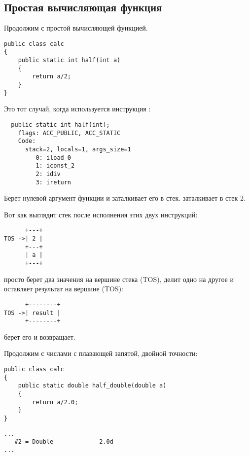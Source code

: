 \subsection{Простая вычисляющая функция}

Продолжим с простой вычисляющей функцией.

\begin{lstlisting}[style=customjava]
public class calc
{
	public static int half(int a)
	{
		return a/2;
	}
}
\end{lstlisting}


Это тот случай, когда используется инструкция :

\begin{lstlisting}
  public static int half(int);
    flags: ACC_PUBLIC, ACC_STATIC
    Code:
      stack=2, locals=1, args_size=1
         0: iload_0       
         1: iconst_2      
         2: idiv          
         3: ireturn       
\end{lstlisting}
         
Берет нулевой аргумент функции и заталкивает его в стек.
 заталкивает в стек 2.

Вот как выглядит стек после исполнения этих двух инструкций:

\begin{lstlisting}
      +---+
TOS ->| 2 |
      +---+
      | a |
      +---+
\end{lstlisting}


 просто берет два значения на вершине стека (\ac{TOS}), 
делит одно на другое и оставляет результат на вершине (\ac{TOS}):

\begin{lstlisting}
      +--------+
TOS ->| result |
      +--------+
\end{lstlisting}

 берет его и возвращает.


Продолжим с числами с плавающей запятой, двойной точности:

\begin{lstlisting}[style=customjava]
public class calc
{
	public static double half_double(double a)
	{
		return a/2.0;
	}
}
\end{lstlisting}

\begin{lstlisting}[caption=Constant pool]
...
   #2 = Double             2.0d
...
\end{lstlisting}

